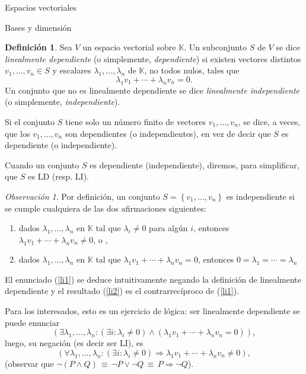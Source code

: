 \documentclass[a4paper,12pt,twoside,spanish,reqno]{amsbook}
\theoremstyle{definition}
\newtheorem{definicion}{Definici\'on}[section]
\theoremstyle{remark}
\newtheorem{observacion}{Observaci\'on}[section]
\newcommand{\K}{\mathbb K}
\begin{document}
\begin{chapter}{Espacios vectoriales}
\begin{section}{Bases y dimensión}
	\begin{definicion}
		Sea $V$ un espacio vectorial sobre $\K$. Un subconjunto $S$ de $V$ se dice \textit{linealmente dependiente} (o simplemente, \textit{dependiente}) si existen vectores distintos $v_1,\ldots,v_n \in S$  y escalares $\lambda_1,\ldots,\lambda_n$ de $\K$, no todos nulos, tales que 	
		\begin{equation*}
			\lambda_1v_1+\cdots+\lambda_nv_n=0.
		\end{equation*}
		Un conjunto que no es linealmente dependiente se dice \textit{linealmente independiente} (o simplemente, \textit{independiente}).
		
		Si el conjunto $S$ tiene solo un número finito de vectores $v_1,\ldots,v_n$, se dice,
		a veces, que los $v_1,\ldots,v_n$ son dependientes (o independientes), en vez de decir
		que $S$ es dependiente (o independiente).
		
		Cuando un conjunto $S$ es dependiente (independiente), diremos,  para simplificar,  que $S$ es LD (resp. LI).
	\end{definicion}

\begin{observacion} Por definición, un conjunto $S = \left\{v_1,\ldots,v_n \right\}$ es independiente si se cumple cualquiera de las dos afirmaciones siguientes:
	\begin{enumerate}[label=(\alph*),ref=\alph*]
		\item\label{li1} dados $\lambda_1,\ldots,\lambda_n$ en $\K$ tal que $\lambda_i \ne 0$ para algún $i$,  entonces  $\lambda_1v_1+\cdots+\lambda_nv_n\not=0$, o ,
		\item \label{li2}dados $\lambda_1,\ldots,\lambda_n$ en $\K$ tal que $\lambda_1v_1+\cdots+\lambda_nv_n=0$,  entonces $0=\lambda_1=\cdots=\lambda_n$
	\end{enumerate}
	El enunciado (\ref{li1}) se deduce intuitivamente negando  la definición de linealmente dependiente y el resultado (\ref{li2}) es el contrarrecíproco  de (\ref{li1}).
	
	
Para los interesados, esto es un ejercicio de lógica: ser linealmente dependiente se puede enunciar 
$$
(\exists \lambda_1,\ldots,\lambda_n: (\exists i: \lambda_i \ne 0) \wedge (\lambda_1v_1+\cdots+\lambda_nv_n=0 )),
$$
luego, su negación  (es decir ser LI), es 
$$
(\forall \lambda_1,\ldots,\lambda_n:  (\exists i: \lambda_i \ne 0) \Rightarrow \lambda_1v_1+\cdots+\lambda_nv_n\ne 0),
$$
(observar  que $\neg(P \wedge Q) \,\equiv\, \neg P \vee \neg Q \,\equiv\, P \Rightarrow \neg Q$). 


\end{observacion}
\end{section}
\end{chapter}
\end{document}
